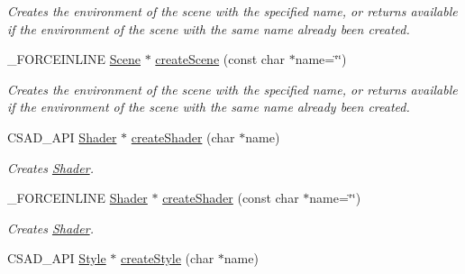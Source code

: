 \begin{DoxyCompactItemize}
\begin{DoxyCompactList}\small\item\em Creates the environment of the scene with the specified name, or returns available if the environment of the scene with the same name already been created. \end{DoxyCompactList}\item 
\hypertarget{classcsad_1_1_graph_a064c03e4562046ada26844c7ec885aaa}{\-\_\-\-F\-O\-R\-C\-E\-I\-N\-L\-I\-N\-E \hyperlink{classcsad_1_1_scene}{Scene} $\ast$ \hyperlink{classcsad_1_1_graph_a064c03e4562046ada26844c7ec885aaa}{create\-Scene} (const char $\ast$name=\char`\"{}\char`\"{})}\label{classcsad_1_1_graph_a064c03e4562046ada26844c7ec885aaa}

\begin{DoxyCompactList}\small\item\em Creates the environment of the scene with the specified name, or returns available if the environment of the scene with the same name already been created. \end{DoxyCompactList}\item 
\hypertarget{classcsad_1_1_graph_a032c241f5e9fca9315d1d48460182a39}{C\-S\-A\-D\-\_\-\-A\-P\-I \hyperlink{classcsad_1_1_shader}{Shader} $\ast$ \hyperlink{classcsad_1_1_graph_a032c241f5e9fca9315d1d48460182a39}{create\-Shader} (char $\ast$name)}\label{classcsad_1_1_graph_a032c241f5e9fca9315d1d48460182a39}

\begin{DoxyCompactList}\small\item\em Creates \hyperlink{classcsad_1_1_shader}{Shader}. \end{DoxyCompactList}\item 
\hypertarget{classcsad_1_1_graph_a8d47d1485e3976eefe0724e252ed0de2}{\-\_\-\-F\-O\-R\-C\-E\-I\-N\-L\-I\-N\-E \hyperlink{classcsad_1_1_shader}{Shader} $\ast$ \hyperlink{classcsad_1_1_graph_a8d47d1485e3976eefe0724e252ed0de2}{create\-Shader} (const char $\ast$name=\char`\"{}\char`\"{})}\label{classcsad_1_1_graph_a8d47d1485e3976eefe0724e252ed0de2}

\begin{DoxyCompactList}\small\item\em Creates \hyperlink{classcsad_1_1_shader}{Shader}. \end{DoxyCompactList}\item 
\hypertarget{classcsad_1_1_graph_a680f5cf5bf6c4c4a79557a660a9f1e7d}{C\-S\-A\-D\-\_\-\-A\-P\-I \hyperlink{classcsad_1_1_style}{Style} $\ast$ \hyperlink{classcsad_1_1_graph_a680f5cf5bf6c4c4a79557a660a9f1e7d}{create\-Style} (char $\ast$name)}\label{classcsad_1_1_graph_a680f5cf5bf6c4c4a79557a660a9f1e7d}


\end{DoxyCompactItemize}
